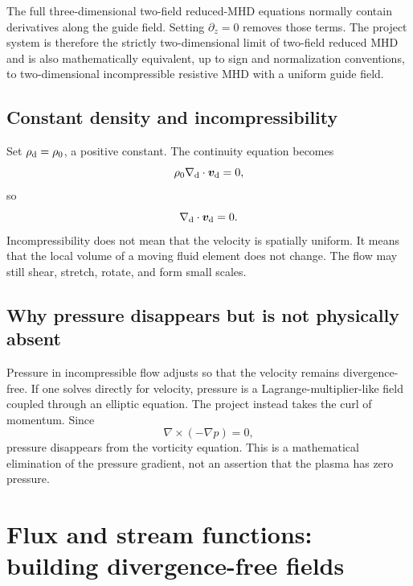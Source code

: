 \begin{warningbox}
The full three-dimensional two-field reduced-MHD equations normally contain derivatives along the guide field. Setting $\partial_z=0$ removes those terms. The project system is therefore the strictly two-dimensional limit of two-field reduced MHD and is also mathematically equivalent, up to sign and normalization conventions, to two-dimensional incompressible resistive MHD with a uniform guide field.
\end{warningbox}

\subsection{Constant density and incompressibility}

Set $\rho_{\rm d}=\rho_0$, a positive constant. The continuity equation becomes
\begin{equation}
\rho_0\nabla_{\rm d}\cdot\bm{v}_{\rm d}=0,
\end{equation}
so
\begin{equation}
\nabla_{\rm d}\cdot\bm{v}_{\rm d}=0.
\end{equation}
Incompressibility does not mean that the velocity is spatially uniform. It means that the local volume of a moving fluid element does not change. The flow may still shear, stretch, rotate, and form small scales.

\subsection{Why pressure disappears but is not physically absent}

Pressure in incompressible flow adjusts so that the velocity remains divergence-free. If one solves directly for velocity, pressure is a Lagrange-multiplier-like field coupled through an elliptic equation. The project instead takes the curl of momentum. Since
\begin{equation}
\nabla\times(-\nabla p)=0,
\end{equation}
pressure disappears from the vorticity equation. This is a mathematical elimination of the pressure gradient, not an assertion that the plasma has zero pressure.

\section{Flux and stream functions: building divergence-free fields}
\label{sec:potentials}

